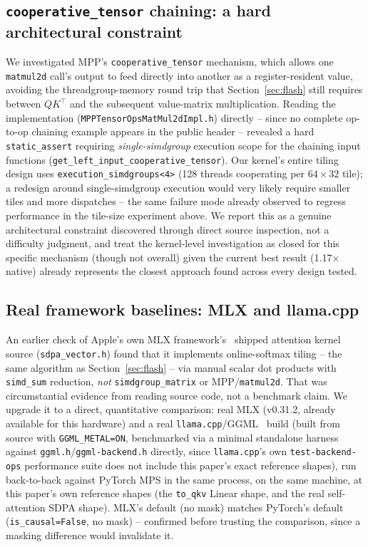 \documentclass[11pt]{article}
\newcommand{\code}[1]{\texttt{#1}}
\begin{document}
\subsection{\code{cooperative\_tensor} chaining: a hard architectural constraint}
\label{sec:coop-tensor}
We investigated MPP's \code{cooperative\_tensor} mechanism, which allows one \code{matmul2d}
call's output to feed directly into another as a register-resident value, avoiding the
threadgroup-memory round trip that Section~\ref{sec:flash} still requires between $QK^\top$ and
the subsequent value-matrix multiplication. Reading the implementation
(\code{MPPTensorOpsMatMul2dImpl.h}) directly -- since no complete op-to-op chaining example
appears in the public header -- revealed a hard \code{static\_assert} requiring
\emph{single-simdgroup} execution scope for the chaining input functions
(\code{get\_left\_input\_cooperative\_tensor}). Our kernel's entire tiling design uses
\code{execution\_simdgroups<4>} (128 threads cooperating per $64\times32$ tile); a redesign around
single-simdgroup execution would very likely require smaller tiles and more dispatches -- the
same failure mode already observed to regress performance in the tile-size experiment above. We
report this as a genuine architectural constraint discovered through direct source inspection,
not a difficulty judgment, and treat the kernel-level investigation as closed for this specific
mechanism (though not overall) given the current best result (1.17$\times$ native) already
represents the closest approach found across every design tested.

\subsection{Real framework baselines: MLX and llama.cpp}
\label{sec:framework-baselines}
An earlier check of Apple's own MLX framework's~\cite{mlx} shipped attention kernel source
(\code{sdpa\_vector.h}) found that it implements online-softmax tiling -- the same algorithm as
Section~\ref{sec:flash} -- via manual scalar dot products with \code{simd\_sum} reduction,
\emph{not} \code{simdgroup\_matrix} or MPP/\code{matmul2d}. That was circumstantial evidence from
reading source code, not a benchmark claim. We upgrade it to a direct, quantitative comparison:
real MLX (v0.31.2, already available for this hardware) and a real \code{llama.cpp}/GGML~\cite{ggml} build
(built from source with \code{GGML\_METAL=ON}, benchmarked via a minimal standalone harness
against \code{ggml.h}/\code{ggml-backend.h} directly, since \code{llama.cpp}'s own
\code{test-backend-ops} performance suite does not include this paper's exact reference shapes),
run back-to-back against PyTorch MPS in the same process, on the same machine, at this paper's own
reference shapes (the \code{to\_qkv} Linear shape, and the real self-attention SDPA shape). MLX's
default (no mask) matches PyTorch's default (\code{is\_causal=False}, no mask) -- confirmed before
trusting the comparison, since a masking difference would invalidate it.
\end{document}
